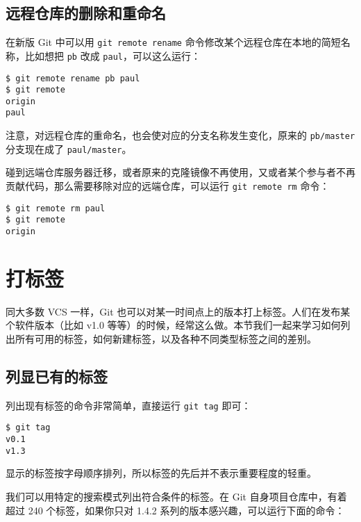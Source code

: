 \documentclass[a4paper]{book}
\begin{document}
\subsection{远程仓库的删除和重命名}

在新版 Git 中可以用 \texttt{git remote rename} 命令修改某个远程仓库在本地的简短名称，比如想把 \texttt{pb} 改成 \texttt{paul}，可以这么运行：

\begin{shaded}\begin{verbatim}
$ git remote rename pb paul
$ git remote
origin
paul
\end{verbatim}\end{shaded}

注意，对远程仓库的重命名，也会使对应的分支名称发生变化，原来的 \texttt{pb/master} 分支现在成了 \texttt{paul/master}。

碰到远端仓库服务器迁移，或者原来的克隆镜像不再使用，又或者某个参与者不再贡献代码，那么需要移除对应的远端仓库，可以运行 \texttt{git remote rm} 命令：

\begin{shaded}\begin{verbatim}
$ git remote rm paul
$ git remote
origin
\end{verbatim}\end{shaded}

\section{打标签}

同大多数 VCS 一样，Git 也可以对某一时间点上的版本打上标签。人们在发布某个软件版本（比如 v1.0 等等）的时候，经常这么做。本节我们一起来学习如何列出所有可用的标签，如何新建标签，以及各种不同类型标签之间的差别。

\subsection{列显已有的标签}

列出现有标签的命令非常简单，直接运行 \texttt{git tag} 即可：

\begin{shaded}\begin{verbatim}
$ git tag
v0.1
v1.3
\end{verbatim}\end{shaded}

显示的标签按字母顺序排列，所以标签的先后并不表示重要程度的轻重。

我们可以用特定的搜索模式列出符合条件的标签。在 Git 自身项目仓库中，有着超过 240 个标签，如果你只对 1.4.2 系列的版本感兴趣，可以运行下面的命令：
\end{document}

